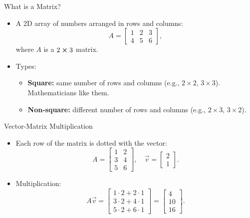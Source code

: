 \documentclass{beamer}
\begin{document}
\begin{frame}{What is a Matrix?}
  \begin{itemize}
    \item A 2D array of numbers arranged in rows and columns:
    \begin{equation}
    A = \begin{bmatrix} 1 & 2 & 3 \\ 4 & 5 & 6 \end{bmatrix},
    \end{equation}
    where \(A\) is a \(2\cross3\) matrix.
    \item Types:
    \begin{itemize}
      \item \textbf{Square:} same number of rows and columns (e.g., $2\times2$, $3\times3$). Mathematicians like them.
      \item \textbf{Non-square:} different number of rows and columns (e.g., $2\times3$, $3\times2$).
    \end{itemize}
  \end{itemize}
\end{frame}

\begin{frame}{Vector-Matrix Multiplication}
  \begin{itemize}
    \item Each row of the matrix is dotted with the vector:
    \begin{equation}
    A = \begin{bmatrix} 1 & 2 \\ 3 & 4 \\ 5 & 6 \end{bmatrix}, \quad \vec{v} = \begin{bmatrix} 2 \\ 1 \end{bmatrix}.
    \end{equation}
    \item Multiplication:
    \begin{equation}
    A\vec{v} = \begin{bmatrix}
    1\cdot2 + 2\cdot1 \\
    3\cdot2 + 4\cdot1 \\
    5\cdot2 + 6\cdot1
    \end{bmatrix} = \begin{bmatrix} 4 \\ 10 \\ 16 \end{bmatrix}.
    \end{equation}
  \end{itemize}
\end{frame}
\end{document}

